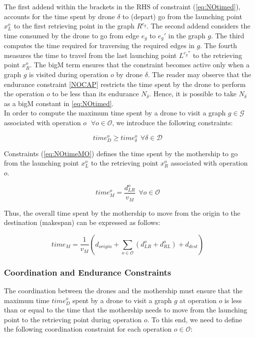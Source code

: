 \documentclass[10pt,a4paper]{elsarticle}
\begin{document}
			\noindent
			The first addend within the brackets in the RHS of constraint (\ref{eq:NOtimed}), accounts for the time spent by drone $\delta$ to (depart) go from the launching point $x_L^o$ to the first retrieving point in the graph $R^{e_g}$. The second addend considers the time consumed by the drone to go from edge $e_g$ to $e_g'$ in the graph $g$. The third computes the time required for traversing the required edges in $g$. The fourth measures the time to travel from the last launching point $L^{e_g''}$ to the retrieving point $x_R^o$.
			The bigM term ensures that the constraint becomes active only when a graph $g$ is visited during operation $o$ by drone $\delta$. The reader may observe that the endurance constraint \eqref{NOCAP} restricts the time spent by the drone to perform the operation $o$ to be less than its endurance $N_\delta$. Hence, it is possible to take $N_\delta$ as a bigM constant in \eqref{eq:NOtimed}.\\
			
			
			\noindent
			In order to compute the maximum time spent by a drone to visit a graph $g \in \mathcal G$ associated with operation $o \:\:\ \forall o \in \mathcal O$, we introduce the following constraints:
			
			\begin{equation}
				time_D^o \geq time_\delta^o \:\: \forall \delta \in \mathcal D
				\label{eq:NOtimeD}
			\end{equation}
			
			\noindent
			Constraints (\ref{eq:NOtimeMO}) defines the time spent by the mothership to go from the launching point $x_L^o$ to the retrieving point $x_R^o$ associated with operation $o$. 
			
			\begin{equation}
				time_M^o = \frac{d_{LR}^o}{v_M} \:\: \forall o \in \mathcal O
				\label{eq:NOtimeMO}
			\end{equation}
			
			\noindent
			Thus, the overall time spent by the mothership to move from the origin to the destination (makespan) can be expressed as follows:
			
			\begin{equation}
				time_M = \frac{1}{v_M} (d_{origin} + \sum_{o \in \mathcal O} (d_{LR}^o + d_{RL}^o) + d_{dest})
				\label{eq:NOtimeM}
			\end{equation}
			
			
			\subsubsection*{Coordination and Endurance Constraints}
			\noindent
			The coordination between the drones and the mothership must ensure that the maximum time $time_D^o$ spent by a drone to visit a graph $g$ at operation $o$ is less than or equal to the time that the mothership needs to move from the launching point to the retrieving point during operation $o$. To this end, we need to define the following coordination constraint for each operation $o\in \mathcal O$:
			
\end{document}

